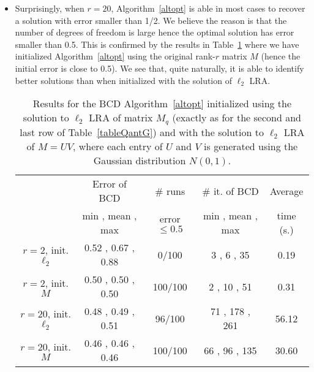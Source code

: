 \documentclass[a4paper,11pt]{article}
\numberwithin{equation}{section}
\begin{document}
\begin{itemize}
\item Surprisingly, when $r = 20$, Algorithm~\ref{altopt} is able in most cases to recover a solution with error smaller than 1/2. We believe the reason is that the number of degrees of freedom is large hence the optimal solution has error smaller than 0.5. 
This is confirmed by the results in Table~\ref{tableQantGv2} where we have initialized Algorithm~\ref{altopt} using the original rank-$r$ matrix $M$ (hence the initial error is close to 0.5). We see that, quite naturally, it is able to identify better solutions than when initialized with the solution of $\ell_2$ LRA.  
\begin{center}
 \begin{table}[h!]
 \begin{center}
\caption{ 
Results for the BCD Algorithm~\ref{altopt} initialized using the solution to $\ell_2$ LRA of matrix $M_q$ (exactly as for the second and last row of Table~\ref{tableQantG}) and with the solution to $\ell_2$ LRA of $M = UV$, where each entry of $U$ and $V$ is generated using the Gaussian distribution $N(0,1)$. 
\label{tableQantGv2}
}
 \begin{tabular}{|c||c|c|c|c|}
 \hline 
 & Error of BCD & \# runs  & \# it. of BCD & Average  \\  
    & min , mean , max & error $\leq 0.5$ & min , mean , max &  time (s.)   \\ \hline 
 $r=2$, init.\@ $\ell_2$   &   0.52 , 0.67 , 0.88  &     0/100   &    3 ,   6 ,  35 &    0.19    \\ 
$r=2$,  init.\@ $M$        &   0.50 , 0.50 , 0.50  &   100/100   &    2 ,  10 ,  51 &    0.31 \\ \hline 
 $r=20$, init.\@ $\ell_2$  &   0.48 , 0.49 , 0.51  &    96/100   &   71 , 178 , 261 &    56.12    \\
 $r=20$, init.\@ $M$       &    0.46 , 0.46 , 0.46  &   100/100   &   66 ,  96 , 135 &    30.60    \\ \hline 
	\end{tabular} 
 \end{center}
 \end{table}
 \end{center} 

\end{itemize}
\end{document}
